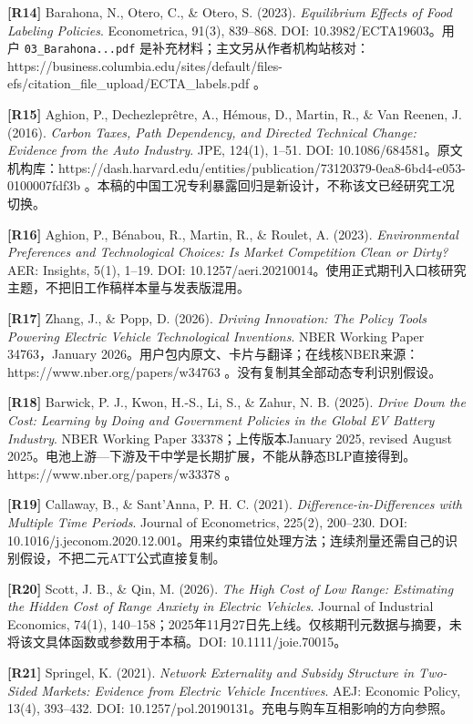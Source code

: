 \documentclass[
  11pt,
]{article}
\begin{document}
\textbf{{[}R14{]}} Barahona, N., Otero, C., \& Otero, S. (2023).
\emph{Equilibrium Effects of Food Labeling Policies}. Econometrica,
91(3), 839--868. DOI: 10.3982/ECTA19603。用户
\texttt{03\_Barahona...pdf}
是补充材料；主文另从作者机构站核对：https://business.columbia.edu/sites/default/files-efs/citation\_file\_upload/ECTA\_labels.pdf
。

\textbf{{[}R15{]}} Aghion, P., Dechezleprêtre, A., Hémous, D., Martin,
R., \& Van Reenen, J. (2016). \emph{Carbon Taxes, Path Dependency, and
Directed Technical Change: Evidence from the Auto Industry}. JPE,
124(1), 1--51. DOI:
10.1086/684581。原文机构库：https://dash.harvard.edu/entities/publication/73120379-0ea8-6bd4-e053-0100007fdf3b
。本稿的中国工况专利暴露回归是新设计，不称该文已经研究工况切换。

\textbf{{[}R16{]}} Aghion, P., Bénabou, R., Martin, R., \& Roulet, A.
(2023). \emph{Environmental Preferences and Technological Choices: Is
Market Competition Clean or Dirty?} AER: Insights, 5(1), 1--19. DOI:
10.1257/aeri.20210014。使用正式期刊入口核研究主题，不把旧工作稿样本量与发表版混用。

\textbf{{[}R17{]}} Zhang, J., \& Popp, D. (2026). \emph{Driving
Innovation: The Policy Tools Powering Electric Vehicle Technological
Inventions}. NBER Working Paper 34763，January
2026。用户包内原文、卡片与翻译；在线核NBER来源：https://www.nber.org/papers/w34763
。没有复制其全部动态专利识别假设。

\textbf{{[}R18{]}} Barwick, P. J., Kwon, H.-S., Li, S., \& Zahur, N. B.
(2025). \emph{Drive Down the Cost: Learning by Doing and Government
Policies in the Global EV Battery Industry}. NBER Working Paper
33378；上传版本January 2025, revised August
2025。电池上游---下游及干中学是长期扩展，不能从静态BLP直接得到。https://www.nber.org/papers/w33378
。

\textbf{{[}R19{]}} Callaway, B., \& Sant'Anna, P. H. C. (2021).
\emph{Difference-in-Differences with Multiple Time Periods}. Journal of
Econometrics, 225(2), 200--230. DOI:
10.1016/j.jeconom.2020.12.001。用来约束错位处理方法；连续剂量还需自己的识别假设，不把二元ATT公式直接复制。

\textbf{{[}R20{]}} Scott, J. B., \& Qin, M. (2026). \emph{The High Cost
of Low Range: Estimating the Hidden Cost of Range Anxiety in Electric
Vehicles}. Journal of Industrial Economics, 74(1),
140--158；2025年11月27日先上线。仅核期刊元数据与摘要，未将该文具体函数或参数用于本稿。DOI:
10.1111/joie.70015。

\textbf{{[}R21{]}} Springel, K. (2021). \emph{Network Externality and
Subsidy Structure in Two-Sided Markets: Evidence from Electric Vehicle
Incentives}. AEJ: Economic Policy, 13(4), 393--432. DOI:
10.1257/pol.20190131。充电与购车互相影响的方向参照。
\end{document}
